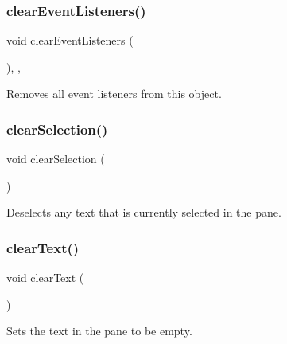 \subsubsection{\texorpdfstring{clear\+Event\+Listeners()}{clearEventListeners()}}
{\footnotesize\ttfamily void clear\+Event\+Listeners (\begin{DoxyParamCaption}{ }\end{DoxyParamCaption})\hspace{0.3cm}{\ttfamily [protected]}, {\ttfamily [virtual]}, {\ttfamily [inherited]}}



Removes all event listeners from this object. 

\mbox{\label{classGBrowserPane_abd07e172ccec6823a88289c21124a367}} 
\subsubsection{\texorpdfstring{clear\+Selection()}{clearSelection()}}
{\footnotesize\ttfamily void clear\+Selection (\begin{DoxyParamCaption}{ }\end{DoxyParamCaption})\hspace{0.3cm}{\ttfamily [virtual]}}



Deselects any text that is currently selected in the pane. 

\mbox{\label{classGBrowserPane_a25f53c7d92eb2a5197cd4418c0165367}} 
\subsubsection{\texorpdfstring{clear\+Text()}{clearText()}}
{\footnotesize\ttfamily void clear\+Text (\begin{DoxyParamCaption}{ }\end{DoxyParamCaption})\hspace{0.3cm}{\ttfamily [virtual]}}



Sets the text in the pane to be empty. 

\mbox{\label{classGObservable_a284f31528c0520f8e545c03ac9eeac74}} 
